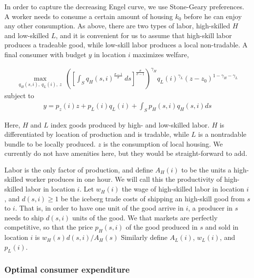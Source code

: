 \documentclass{article}
\begin{document}
In order to capture the decreasing Engel curve, we use Stone-Geary preferences.  A worker needs to consume a certain amount of housing $k_0$ before he can enjoy any other consumption.  As above, there are two types of labor, high-skilled $H$ and low-skilled $L$, and it is convenient for us to assume that high-skill labor produces a tradeable good, while low-skill labor produces a local non-tradable.  A final consumer with budget $y$ in location $i$ maximizes welfare,

\begin{eqnarray}
	\max \limits_{q_H(s,i),~q_L(i),~z} ~
	\left(\left[\int_S q_H(s,i)^{\frac{\sigma - 1}{\sigma}}~ ds\right]^{\frac{\sigma}{\sigma-1}}\right)^{\gamma_H} q_L(i)^{\gamma_L} (z-z_0)^{1-\gamma_H-\gamma_L} \nonumber
\end{eqnarray} 
subject to
\begin{eqnarray}
	y = p_z(i) z + p_L(i)q_L(i) + \int_S p_H(s,i)q_H(s,i) ds  \nonumber
\end{eqnarray}

Here, $H$ and $L$ index goods produced by high- and low-skilled labor. $H$ is differentiated by location of production and is tradable, while $L$ is a nontradable bundle to be locally produced. $z$ is the consumption of local housing.  We currently do not have amenities here, but they would be straight-forward to add.

Labor is the only factor of production, and define $A_H(i)$ to be the units a high-skilled worker produces in one hour.  We will call this the productivity of high-skilled labor in location $i$.  Let $w_H(i)$ the wage of high-skilled labor in location $i$, and $d(s,i) \geq 1$ be the iceberg trade costs of shipping an high-skill good from $s$ to $i$.  That is, in order to have one unit of the good arrive in $i$, a producer in $s$ needs to ship $d(s,i)$ units of the good.  We that markets are perfectly competitive, so that the price $p_H(s,i)$ of the good produced in $s$ and sold in location $i$ is $w_H(s)d(s,i)/A_H(s)$ Similarly define $A_L(i)$, $w_L(i)$, and $p_L(i)$. 

\subsubsection{Optimal consumer expenditure}
\end{document}
